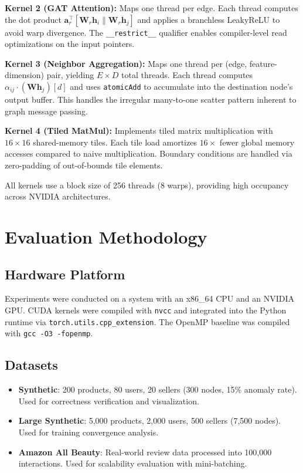 \documentclass[conference]{IEEEtran}
\begin{document}
\textbf{Kernel 2 (GAT Attention):} Maps one thread per edge. Each thread computes the dot product $\mathbf{a}_r^\top[\mathbf{W}_r\mathbf{h}_i \| \mathbf{W}_r\mathbf{h}_j]$ and applies a branchless LeakyReLU to avoid warp divergence. The \texttt{\_\_restrict\_\_} qualifier enables compiler-level read optimizations on the input pointers.

\textbf{Kernel 3 (Neighbor Aggregation):} Maps one thread per (edge, feature-dimension) pair, yielding $E \times D$ total threads. Each thread computes $\alpha_{ij} \cdot (\mathbf{W}\mathbf{h}_j)[d]$ and uses \texttt{atomicAdd} to accumulate into the destination node's output buffer. This handles the irregular many-to-one scatter pattern inherent to graph message passing.

\textbf{Kernel 4 (Tiled MatMul):} Implements tiled matrix multiplication with $16 \times 16$ shared-memory tiles. Each tile load amortizes $16\times$ fewer global memory accesses compared to naive multiplication. Boundary conditions are handled via zero-padding of out-of-bounds tile elements.

All kernels use a block size of 256 threads (8 warps), providing high occupancy across NVIDIA architectures.

\section{Evaluation Methodology}
\subsection{Hardware Platform}
Experiments were conducted on a system with an x86\_64 CPU and an NVIDIA GPU. CUDA kernels were compiled with \texttt{nvcc} and integrated into the Python runtime via \texttt{torch.utils.cpp\_extension}. The OpenMP baseline was compiled with \texttt{gcc -O3 -fopenmp}.

\subsection{Datasets}
\begin{itemize}
    \item \textbf{Synthetic}: 200 products, 80 users, 20 sellers (300 nodes, 15\% anomaly rate). Used for correctness verification and visualization.
    \item \textbf{Large Synthetic}: 5{,}000 products, 2{,}000 users, 500 sellers (7{,}500 nodes). Used for training convergence analysis.
    \item \textbf{Amazon All Beauty}: Real-world review data processed into 100{,}000 interactions. Used for scalability evaluation with mini-batching.
\end{itemize}
\end{document}
